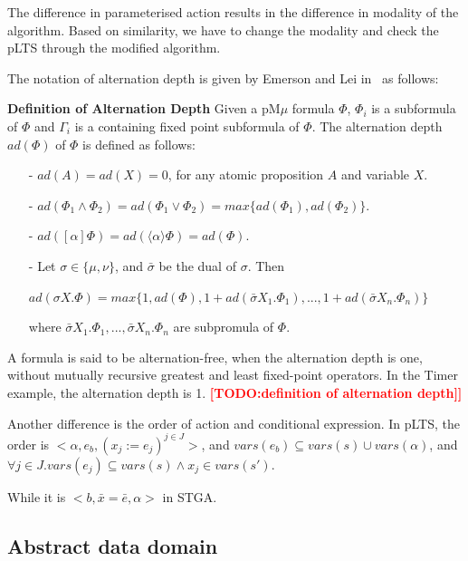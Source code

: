 \documentclass[runningheads,a4paper]{llncs}
\newcommand{\TODO}[1]{\textcolor{red}{\textbf{[TODO:#1]}}}
\begin{document}
The difference in parameterised action results in the difference in modality of the algorithm. Based on similarity, we have to change the modality and check the pLTS through the modified algorithm.  

The notation of alternation depth is given by Emerson and Lei in~\cite{emerson1986alternation} as follows:

\textbf{Definition of Alternation Depth}
Given a pM$\mu$ formula $\Phi$, $\Phi_{i}$ is a subformula of $\Phi$ and $\Gamma_{i}$ is a containing fixed point subformula of $\Phi$. The alternation depth $ad(\Phi)$ of $\Phi$ is defined as follows:

\begin{itemize}
\item[-] $ad(A) = ad(X) = 0$, for any atomic proposition $A$ and variable $X$.
\item[-] $ad(\Phi_{1}\wedge\Phi_{2}) = ad(\Phi_{1}\vee\Phi_{2}) = max\{ ad(\Phi_{1}), ad(\Phi_{2})\}$.
\item[-] $ad([\alpha]\Phi) = ad(\langle\alpha\rangle\Phi) = ad(\Phi)$.
\item[-] Let $\sigma\in\{\mu,\nu\}$, and $\bar{\sigma}$ be the dual of $\sigma$. Then
	\begin{center}
	$ad(\sigma X.\Phi) = max\{1, ad(\Phi), 1+ad(\bar{\sigma} X_{1}.\Phi_{1}), ... , 1+ ad(\bar{\sigma} X_{n}.\Phi_{n})\}$
	\end{center} 
	where $\bar{\sigma} X_{1}.\Phi_{1}, ... , \bar{\sigma} X_{n}.\Phi_{n}$ are subpromula of $\Phi$.
\end{itemize}

A formula is said to be alternation-free, when the alternation depth is one, without mutually recursive greatest and least fixed-point operators. In the Timer example, the alternation depth is 1. \TODO{definition of alternation depth]}

 {\color{red}{The order of action and conditional expression???}}
Another difference is the order of action and conditional expression. In pLTS, the order is $<\alpha, e_{b}, (x_{j}:=e_{j})^{j\in J}>$,  and $vars(e_{b})\subseteq vars(s)\cup vars(\alpha)$, and $\forall j\in J. vars(e_{j})\subseteq vars(s)\wedge x_{j}\in vars(s')$. 

While it is $< b, \bar{x}=\bar{e}, \alpha>$ in STGA.


\subsection{Abstract data domain}
\end{document}
